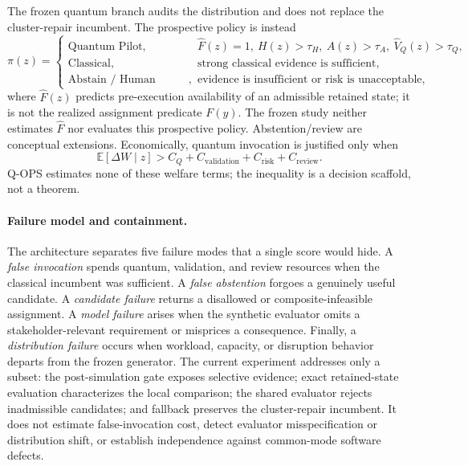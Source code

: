 The frozen quantum branch audits the distribution and does not replace the cluster-repair incumbent. The prospective policy is instead
\begin{equation}
\pi(z)=\begin{cases}
\text{Quantum Pilot},&\widehat F(z)=1,\ H(z)>\tau_H,\ A(z)>\tau_A,\ \widehat V_Q(z)>\tau_Q,\\
\text{Classical},&\text{strong classical evidence is sufficient},\\
\text{Abstain / Human Review},&\text{evidence is insufficient or risk is unacceptable},
\end{cases}
\label{eq:router}
\end{equation}
where $\widehat F(z)$ predicts pre-execution availability of an admissible retained state; it is not the realized assignment predicate $F(y)$. The frozen study neither estimates $\widehat F$ nor evaluates this prospective policy. Abstention/review are conceptual extensions. Economically, quantum invocation is justified only when
\begin{equation}
\mathbb E[\Delta W\mid z]>C_Q+C_{\mathrm{validation}}+C_{\mathrm{risk}}+C_{\mathrm{review}}.
\label{eq:economics}
\end{equation}
Q-OPS estimates none of these welfare terms; the inequality is a decision scaffold, not a theorem.

\paragraph{Failure model and containment.}
The architecture separates five failure modes that a single score would hide. A \emph{false invocation} spends quantum, validation, and review resources when the classical incumbent was sufficient. A \emph{false abstention} forgoes a genuinely useful candidate. A \emph{candidate failure} returns a disallowed or composite-infeasible assignment. A \emph{model failure} arises when the synthetic evaluator omits a stakeholder-relevant requirement or misprices a consequence. Finally, a \emph{distribution failure} occurs when workload, capacity, or disruption behavior departs from the frozen generator. The current experiment addresses only a subset: the post-simulation gate exposes selective evidence; exact retained-state evaluation characterizes the local comparison; the shared evaluator rejects inadmissible candidates; and fallback preserves the cluster-repair incumbent. It does not estimate false-invocation cost, detect evaluator misspecification or distribution shift, or establish independence against common-mode software defects.

